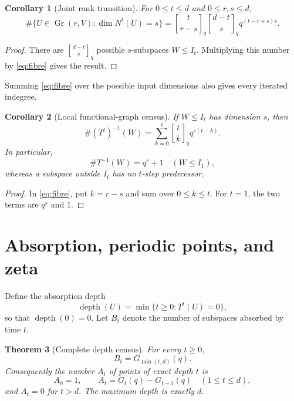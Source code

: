 \documentclass[11pt,a4paper]{amsart}
\newcommand{\Gr}{\operatorname{Gr}}
\newcommand{\depth}{\operatorname{depth}}
\newcommand{\qbinom}[2]{\genfrac{[}{]}{0pt}{}{#1}{#2}_{q}}
\newtheorem{theorem}{Theorem}[section]
\newtheorem{corollary}[theorem]{Corollary}
\begin{document}
\begin{corollary}[Joint rank transition]
\label{cor:transition}
For $0\leq t\leq d$ and $0\leq r,s\leq d$,
\begin{equation}
 \label{eq:transition}
 \#\{U\in\Gr(r,V):\dim N^t(U)=s\}
 =\qbinom{t}{r-s}\qbinom{d-t}{s}q^{(t-r+s)s}.
\end{equation}
\end{corollary}

\begin{proof}
There are $\qbinom{d-t}{s}$ possible $s$-subspaces $W\leq I_t$.
Multiplying this number by \eqref{eq:fibre} gives the result.
\end{proof}

Summing \eqref{eq:fibre} over the possible input dimensions also gives every
iterated indegree.

\begin{corollary}[Local functional-graph census]
\label{cor:indegree}
If $W\leq I_t$ has dimension $s$, then
\begin{equation}
 \label{eq:tindegree}
 \#(T^t)^{-1}(W)
 =\sum_{k=0}^{t}\qbinom{t}{k}q^{s(t-k)}.
\end{equation}
In particular,
\begin{equation}
 \label{eq:indegree}
 \#T^{-1}(W)=q^s+1\quad(W\leq I_1),
\end{equation}
whereas a subspace outside $I_t$ has no $t$-step predecessor.
\end{corollary}

\begin{proof}
In \eqref{eq:fibre}, put $k=r-s$ and sum over $0\leq k\leq t$.
For $t=1$, the two terms are $q^s$ and $1$.
\end{proof}

\section{Absorption, periodic points, and zeta}

Define the absorption depth
\[
 \depth(U)=\min\{t\geq0:T^t(U)=0\},
\]
so that $\depth(0)=0$.  Let $B_t$ denote the number of subspaces absorbed by
time $t$.

\begin{theorem}[Complete depth census]
\label{thm:depth}
For every $t\geq0$,
\begin{equation}
 \label{eq:cdf}
 B_t=G_{\min(t,d)}(q).
\end{equation}
Consequently the number $A_t$ of points of exact depth $t$ is
\begin{equation}
 \label{eq:layers}
 A_0=1,
 \qquad
 A_t=G_t(q)-G_{t-1}(q)\quad(1\leq t\leq d),
\end{equation}
and $A_t=0$ for $t>d$.  The maximum depth is exactly $d$.
\end{theorem}
\end{document}
